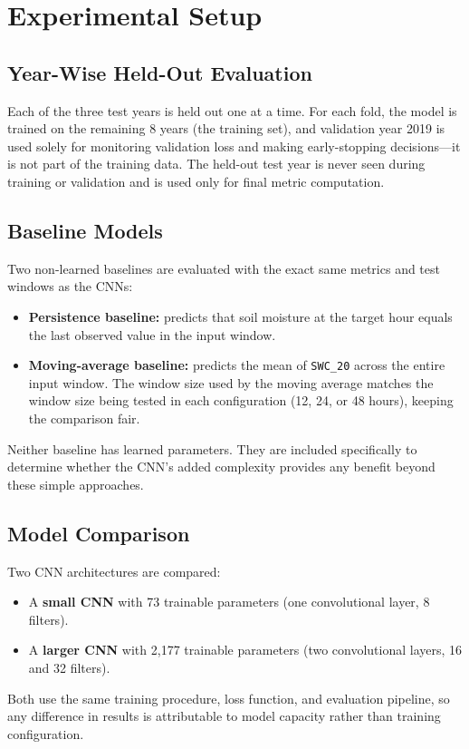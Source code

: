 \documentclass[11pt]{article}
\begin{document}
\section{Experimental Setup}

\subsection{Year-Wise Held-Out Evaluation}

Each of the three test years is held out one at a time. For each fold, the model is
trained on the remaining 8 years (the training set), and validation year 2019 is used
solely for monitoring validation loss and making early-stopping decisions---it is not
part of the training data. The held-out test year is never seen during training or
validation and is used only for final metric computation.

\subsection{Baseline Models}

Two non-learned baselines are evaluated with the exact same metrics and test windows
as the CNNs:
\begin{itemize}
    \item \textbf{Persistence baseline:} predicts that soil moisture at the target
    hour equals the last observed value in the input window.
    \item \textbf{Moving-average baseline:} predicts the mean of \texttt{SWC\_20}
    across the entire input window. The window size used by the moving average
    matches the window size being tested in each configuration (12, 24, or 48
    hours), keeping the comparison fair.
\end{itemize}
Neither baseline has learned parameters. They are included specifically to determine
whether the CNN's added complexity provides any benefit beyond these simple
approaches.

\subsection{Model Comparison}

Two CNN architectures are compared:
\begin{itemize}
    \item A \textbf{small CNN} with 73 trainable parameters (one convolutional layer,
    8 filters).
    \item A \textbf{larger CNN} with 2{,}177 trainable parameters (two convolutional
    layers, 16 and 32 filters).
\end{itemize}
Both use the same training procedure, loss function, and evaluation pipeline, so any
difference in results is attributable to model capacity rather than training
configuration.
\end{document}
